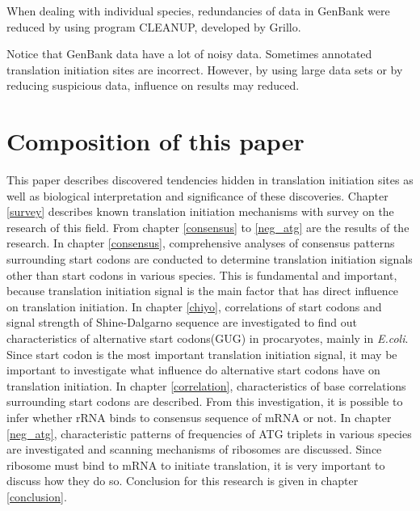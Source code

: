 When dealing with individual species, redundancies of data in GenBank
were reduced by using program CLEANUP, developed by
Grillo\cite{label875}.

Notice that GenBank data have a lot of noisy data. Sometimes annotated
translation initiation sites are incorrect. However, by using large data 
sets or by reducing suspicious data, influence on results may reduced.

\section{Composition of this paper}

This paper describes discovered tendencies hidden in translation
initiation sites as well as biological interpretation and significance
of these discoveries. Chapter \ref{survey} describes known translation
initiation mechanisms with survey on the research of this field. From
chapter \ref{consensus} to \ref{neg_atg} are the results of the
research. In chapter \ref{consensus}, comprehensive analyses of
consensus patterns surrounding start codons are conducted to determine
translation initiation signals other than start codons in various
species. This is fundamental and important, because translation
initiation signal is the main factor that has direct influence on
translation initiation. In chapter \ref{chiyo}, correlations of start
codons and signal strength of Shine-Dalgarno sequence are investigated
to find out characteristics of alternative start codons(GUG) in
procaryotes, mainly in {\it E.coli}. Since start codon is the most
important translation initiation signal, it may be important to
investigate what influence do alternative start codons have on
translation initiation. In chapter \ref{correlation}, characteristics of
base correlations surrounding start codons are described.  From this
investigation, it is possible to infer whether rRNA binds to consensus
sequence of mRNA or not.  In chapter \ref{neg_atg}, characteristic
patterns of frequencies of ATG triplets in various species are
investigated and scanning mechanisms of ribosomes are discussed. Since
ribosome must bind to mRNA to initiate translation, it is very important
to discuss how they do so. Conclusion for this research is given in
chapter \ref{conclusion}.


